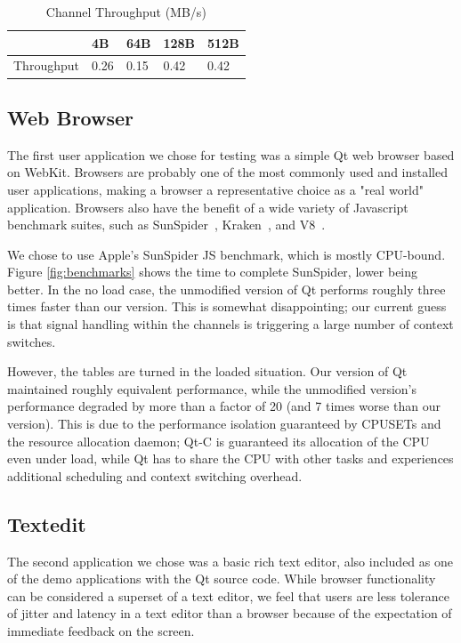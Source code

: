 \documentclass[letterpaper,twocolumn,10pt]{article}
\begin{document}
\begin{table}[tp]
\caption{Channel Throughput (MB/s)}
\centering
\label{tab:channel_tput}
\begin{tabular}{|l | l | l | l | l |}
\hline
			&4B 	& 64B	& 128B	& 512B \\ \hline
Throughput	&0.26	&0.15	&0.42	& 0.42 \\
\hline
\end{tabular}
\end{table}


\subsection{Web Browser}

The first user application we chose for testing was a simple Qt web browser based on WebKit. Browsers are probably one of the most commonly used and installed user applications, making a browser a representative choice as a "real world" application. Browsers also have the benefit of a wide variety of Javascript benchmark suites, such as SunSpider~\cite{sunspider}, Kraken~\cite{kraken}, and V8~\cite{v8benchmark}.

We chose to use Apple's SunSpider JS benchmark, which is mostly CPU-bound. Figure \ref{fig:benchmarks} shows the time to complete SunSpider, lower being better. In the no load case, the unmodified version of Qt performs roughly three times faster than our version. This is somewhat disappointing; our current guess is that signal handling within the channels is triggering a large number of context switches.

However, the tables are turned in the loaded situation. Our version of Qt maintained roughly equivalent performance, while the unmodified version's performance degraded by more than a factor of 20 (and 7 times worse than our version). This is due to the performance isolation guaranteed by CPUSETs and the resource allocation daemon; Qt-C is guaranteed its allocation of the CPU even under load, while Qt has to share the CPU with other tasks and experiences additional scheduling and context switching overhead.

\subsection{Textedit}

The second application we chose was a basic rich text editor, also included as one of the demo applications with the Qt source code. While browser functionality can be considered a superset of a text editor, we feel that users are less tolerance of jitter and latency in a text editor than a browser because of the expectation of immediate feedback on the screen. 
\end{document}

